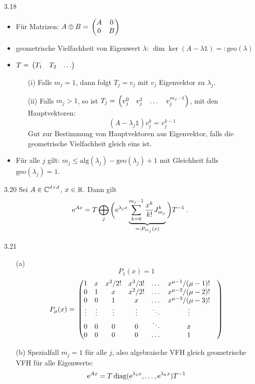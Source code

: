 \documentclass[a4paper]{article}
\begin{document}
\begin{Bemerkung}{}{3.18}
\begin{itemize}
\item Für Matrizen: $A\oplus B=\mathop{}\begin{pmatrix}A&0\\0&B\end{pmatrix}$
\item geometrische Vielfachheit von Eigenwert $\lambda$: $\dim \ker(A-\lambda\mathds1)=:\mathrm{geo}(\lambda)$
\item $T=\mathop{}\begin{pmatrix}T_1&T_2&\dots\end{pmatrix}$
\begin{itemize}
\item[(i)]Falls $m_j=1$, dann folgt  $T_j=v_j$ mit $v_j$ Eigenvektor zu $\lambda_j$.
\item[(ii)] Falls $m_j>1$, so ist $T_j=\mathop{}\begin{pmatrix}v_j^0&v_j^1&\dots&v_j^{m_j-1}\end{pmatrix}$, mit den Hauptvektoren: 
\[(A-\lambda_j\mathds1)v_j^k=v_j^{k-1}\]
Gut zur Bestimmung von Hauptvektoren aus Eigenvektor, falls die geometrische Vielfachheit gleich eins ist.
\end{itemize}
\item Für alle $j$ gilt: $m_j\le\text{alg}(\lambda_j)-\text{geo}(\lambda_j)+1$ mit Gleichheit falls $\text{geo}(\lambda_j)=1$.
\end{itemize}
\end{Bemerkung}

\begin{Kor}{}{3.20}
Sei $A\in\operatorname{\mathbb C}^{d\times d}$, $x\in \mathbb R$. Dann gilt
\[\mathrm{e}^{Ax}=T\bigoplus_j\bigg(\mathrm{e}^{\lambda_jx}\underbrace{\sum_{k=0}^{m_j-1}\frac{x^k}{k!}J_{m_j}^k}_{=:P_{m_j}(x)}\bigg)T^{-1}\;.\]
\end{Kor}

\begin{Bemerkung}{}{3.21}
\begin{itemize}
\item[(a)] 
\[P_1(x)=1\]
\[P_{\mu}(x)=\mathop{}\begin{pmatrix}
1&x&x^2/2!&x^3/3!&\dots&x^{\mu-1}/(\mu-1)!\\
0&1&x&x^2/2!&\dots&x^{\mu-2}/(\mu-2)!\\
0&0&1&x&\dots&x^{\mu-3}/(\mu-3)!\\
\vdots&\vdots&\vdots&\vdots&\ddots&\vdots&\\
0&0&0&0&\ddots&x\\
0&0&0&0&\dots&1
\end{pmatrix}\]
\item[(b)] Spezialfall $m_j=1$ für alle $j$, also algebraische VFH gleich geometrische VFH für alle Eigenwerte:
\[\mathrm{e}^{Ax}=T\operatorname{\mathrm{diag}}(\mathrm{e}^{\lambda_1x},\ldots,\mathrm{e}^{\lambda_kx})T^{-1}\]
\end{itemize}
\end{Bemerkung}
\end{document}
